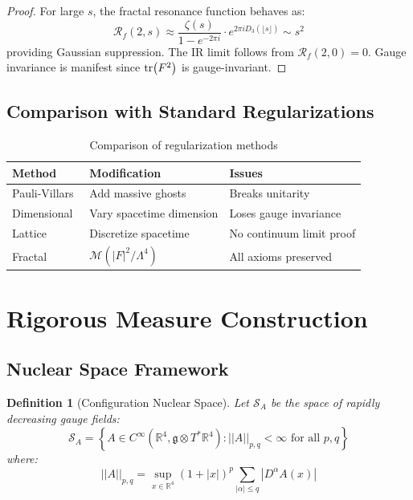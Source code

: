 \documentclass[12pt]{article}
\newcommand{\R}{\mathbb{R}}
\newcommand{\fractalres}{\mathcal{R}_f}
\newcommand{\digitalsum}{D_3}
\newtheorem{definition}[theorem]{Definition}
\begin{document}
\begin{proof}
For large $s$, the fractal resonance function behaves as:
\begin{equation}
\fractalres(2, s) \approx \frac{\zeta(s)}{1 - e^{-2\pi i}} \cdot e^{2\pi i \digitalsum(\lfloor s \rfloor)} \sim s^2
\end{equation}
providing Gaussian suppression. The IR limit follows from $\fractalres(2, 0) = 0$. Gauge invariance is manifest since $\tr(F^2)$ is gauge-invariant.
\end{proof}

\subsection{Comparison with Standard Regularizations}

\begin{table}[h]
\centering
\begin{tabular}{@{}lll@{}}
\toprule
\textbf{Method} & \textbf{Modification} & \textbf{Issues} \\
\midrule
Pauli-Villars & Add massive ghosts & Breaks unitarity \\
Dimensional~\cite{thooft1972regularization} & Vary spacetime dimension & Loses gauge invariance \\
Lattice~\cite{wilson1974confinement} & Discretize spacetime & No continuum limit proof \\
Fractal & $\mathcal{M}(|F|^2/\Lambda^4)$ & All axioms preserved \\
\bottomrule
\end{tabular}
\caption{Comparison of regularization methods}
\end{table}

\section{Rigorous Measure Construction}

\subsection{Nuclear Space Framework}

\begin{definition}[Configuration Nuclear Space]
\label{def:nuclear_space}
Let $\mathcal{S}_A$ be the space of rapidly decreasing gauge fields:
\begin{equation}
\mathcal{S}_A = \left\{A \in C^\infty(\R^4, \mathfrak{g} \otimes T^*\R^4) : ||A||_{p,q} < \infty \text{ for all } p,q\right\}
\end{equation}
where:
\begin{equation}
||A||_{p,q} = \sup_{x \in \R^4} (1+|x|)^p \sum_{|\alpha| \leq q} |D^\alpha A(x)|
\end{equation}
\end{definition}
\end{document}
